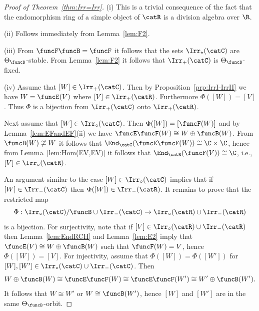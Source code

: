 \documentclass[12pt]{amsart}
\begin{document}
\begin{proof}[Proof of Theorem~\ref{thm:Irr=Irr}]
(i) This is a trivial consequence of the fact that the endomorphism ring of a simple object of $\catR$ is a division algebra over $\R$. 

(ii) Follows immediately from Lemma~\ref{lem:F2}. 

(iii) From $\funcF\funcB=
\funcF$ it follows that the sets $\Irr_\star(\catC)$ are $\Theta_\funcB$-stable. 
From Lemma~\ref{lem:F2} it follows that $\Irr_+(\catC)$ is $\Theta_\funcB$-fixed. 

(iv)
Assume that $[W]\in\Irr_+(\catC)$. 
Then by Proposition~\ref{prp:IrrI-IrrII} we have $W=\funcE(V)$ where $[V]\in\Irr_+(\catR)$. Furthermore $\Phi([W])=[V]$. Thus $\Phi$ is a bijection from $\Irr_+(\catC)$ onto $\Irr_+(\catR)$. 

Next assume that $[W]\in \Irr_\circ(\catC)$. Then 
$\Phi([W])=[\funcF(W)]$ and 
by Lemma~\ref{lem:EFandEF}(ii) we have 
$\funcE\funcF(W)\cong W\oplus \funcB(W)$. From $\funcB(W)\not\cong W$ it follows that 
$\End_{\catC}(\funcE\funcF(W))\cong \C\times \C$, hence from Lemma~\ref{lem:Hom(EV,EV)} it follows that $\End_\catR(\funcF(V))\cong\C$, i.e., $[V]\in\Irr_\circ(\catR)$. 

An argument similar to the case $[W]\in\Irr_\circ(\catC)$ implies that if $[W]\in\Irr_-(\catC)$ then $\Phi([W])\in\Irr_-(\catR)$. It remains to prove that the restricted map \[\Phi:\Irr_\circ(\catC)/\funcB\cup\Irr_-(\catC)\to 
\Irr_\circ(\catR)\cup\Irr_-(\catR)
\] is a bijection. For surjectivity, note that if $[V]\in\Irr_\circ(\catR)\cup\Irr_-(\catR)$ then  Lemma~\ref{lem:EndRCH} and Lemma~\ref{lem:E2} imply that 
$\funcE(V)\cong W\oplus \funcB(W)$ such that $\funcF(W)=V$, hence $\Phi([W])=[V]$. 
For injectivity, assume that 
$\Phi([W])=\Phi([W'])$ for $[W],[W']\in\Irr_\circ(\catC)\cup\Irr_-(\catC)$. Then 
\[
W\oplus \funcB(W)\cong 
\funcE\funcF(W)\cong \funcE\funcF(W')\cong W'\oplus \funcB(W').
\]
It follows that $W\cong W'$ or $W\cong \funcB(W')$, hence $[W]$ and $[W']$ are in the same $\Theta_\funcB$-orbit. 
\end{proof}
\end{document}
